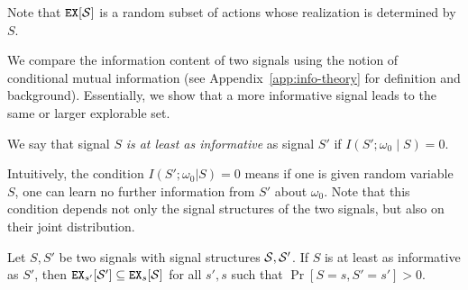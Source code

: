 Note that $\EX[\S]$ is a random subset of actions whose realization is determined by $S$.

We compare the information content of two signals using the notion of conditional mutual information (see Appendix~\ref{app:info-theory} for definition and background). Essentially, we show that a more informative signal leads to the same or larger explorable set.

\begin{definition}
We say that signal $S$ \emph{is at least as informative} as signal $S'$ if $I(S' ; \omega_0\mid S) = 0$.
\end{definition}

Intuitively, the condition $I(S';\omega_0|S)= 0$  means if one is given random variable $S$, one can learn no further information from $S'$ about $\omega_0$. Note that this condition depends not only the signal structures of the two signals, but also on their joint distribution.

\begin{lemma}
\label{lem:infomono}
Let $S,S'$ be two signals with signal structures $\S,\S'$. If $S$ is at least as informative as $S'$, then $\EX_{s'}[\S'] \subseteq \EX_s[\S]$ for all $s' ,s$ such that $\Pr[S= s, S'= s'] > 0$.
\end{lemma}

